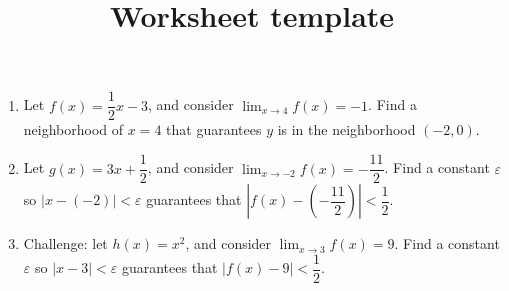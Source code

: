 \documentclass[12pt]{article}
\title{Worksheet template}
\begin{document}
\bigskip
\bigskip

\begin{enumerate}
    
	\item Let $f(x) = \dfrac{1}{2} x - 3$, and consider $\displaystyle \lim_{x \to 4} f(x) = -1$.  Find a neighborhood of $x = 4$ that 
    	guarantees $y$ is in the neighborhood $(-2,0)$.

	\item Let $g(x) = 3x + \dfrac{1}{2}$, and consider $\displaystyle \lim_{x \to -2} f(x) = - \dfrac{11}{2}$.  Find a constant $\varepsilon$ so $\left| x - (-2) \right| < \varepsilon$  guarantees that $\left| f(x) - \left( - \dfrac{11}{2} \right) \right| < \dfrac{1}{2}$.     

\clearpage
	\item Challenge: let $h(x) = x^2$, and consider $\displaystyle \lim_{x \to 3} f(x) = 9$.  Find a constant $\varepsilon$ so $\left| x - 3 \right| < \varepsilon$  guarantees that $\left| f(x) - 9 \right| < \dfrac{1}{2}$.    

\end{enumerate}
\end{document}
